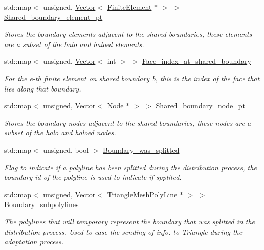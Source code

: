 \begin{DoxyCompactItemize}
std\+::map$<$ unsigned, \hyperlink{classoomph_1_1Vector}{Vector}$<$ \hyperlink{classoomph_1_1FiniteElement}{Finite\+Element} $\ast$ $>$ $>$ \hyperlink{classoomph_1_1TriangleMesh_afa3e46babf3984371ce4da85b110b6fa}{Shared\+\_\+boundary\+\_\+element\+\_\+pt}
\begin{DoxyCompactList}\small\item\em Stores the boundary elements adjacent to the shared boundaries, these elements are a subset of the halo and haloed elements. \end{DoxyCompactList}\item 
std\+::map$<$ unsigned, \hyperlink{classoomph_1_1Vector}{Vector}$<$ int $>$ $>$ \hyperlink{classoomph_1_1TriangleMesh_a47e462ebe20246557b6e68623942670b}{Face\+\_\+index\+\_\+at\+\_\+shared\+\_\+boundary}
\begin{DoxyCompactList}\small\item\em For the e-\/th finite element on shared boundary b, this is the index of the face that lies along that boundary. \end{DoxyCompactList}\item 
std\+::map$<$ unsigned, \hyperlink{classoomph_1_1Vector}{Vector}$<$ \hyperlink{classoomph_1_1Node}{Node} $\ast$ $>$ $>$ \hyperlink{classoomph_1_1TriangleMesh_a73973f1a76bb9ff555e75b727c676d82}{Shared\+\_\+boundary\+\_\+node\+\_\+pt}
\begin{DoxyCompactList}\small\item\em Stores the boundary nodes adjacent to the shared boundaries, these nodes are a subset of the halo and haloed nodes. \end{DoxyCompactList}\item 
std\+::map$<$ unsigned, bool $>$ \hyperlink{classoomph_1_1TriangleMesh_a62fcac1292abe84ba6b739260cdbfef5}{Boundary\+\_\+was\+\_\+splitted}
\begin{DoxyCompactList}\small\item\em Flag to indicate if a polyline has been splitted during the distribution process, the boundary id of the polyline is used to indicate if spplited. \end{DoxyCompactList}\item 
std\+::map$<$ unsigned, \hyperlink{classoomph_1_1Vector}{Vector}$<$ \hyperlink{classoomph_1_1TriangleMeshPolyLine}{Triangle\+Mesh\+Poly\+Line} $\ast$ $>$ $>$ \hyperlink{classoomph_1_1TriangleMesh_a4bc8a5ed3d771cec7c9f0de730b28a9f}{Boundary\+\_\+subpolylines}
\begin{DoxyCompactList}\small\item\em The polylines that will temporary represent the boundary that was splitted in the distribution process. Used to ease the sending of info. to Triangle during the adaptation process. \end{DoxyCompactList}\item 

\end{DoxyCompactItemize}
